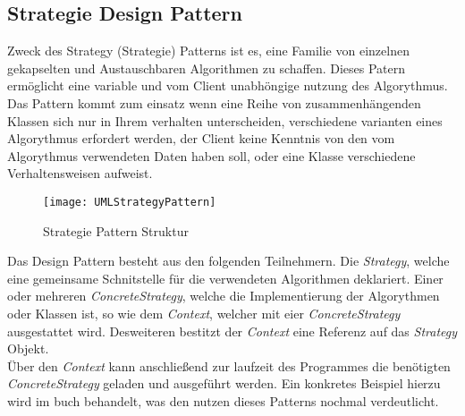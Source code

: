 \subsection{Strategie Design Pattern}
Zweck des Strategy (Strategie) Patterns ist es, eine Familie von einzelnen gekapselten und Austauschbaren Algorithmen zu schaffen. Dieses Patern ermöglicht eine variable und vom Client unabhöngige nutzung des Algorythmus.\\
Das Pattern kommt zum einsatz wenn eine Reihe von zusammenhängenden Klassen sich nur in Ihrem verhalten unterscheiden, verschiedene varianten eines Algorythmus erfordert werden, der Client keine Kenntnis von den vom Algorythmus verwendeten Daten haben soll, oder eine Klasse verschiedene Verhaltensweisen aufweist.\\
\begin{center}
    \begin{figure}[h]
     \centering
     \texttt{[image: UMLStrategyPattern]}
     \caption{Strategie Pattern Struktur \cite{DesignPatterns}}
    \label{fig:StrategyPattern}
    \end{figure}
\end{center}
\vspace{-2cm}
Das Design Pattern besteht aus den folgenden Teilnehmern. Die \textit{Strategy}, welche eine gemeinsame Schnitstelle für die verwendeten Algorithmen deklariert. Einer oder mehreren \textit{ConcreteStrategy}, welche die Implementierung der Algorythmen oder Klassen ist, so wie dem \textit{Context}, welcher mit eier \textit{ConcreteStrategy} ausgestattet wird. Desweiteren bestitzt der \textit{Context} eine Referenz auf das \textit{Strategy} Objekt.\cite[S.383 ff]{DesignPatterns}\\
Über den \textit{Context} kann anschließend zur laufzeit des Programmes die benötigten \textit{ConcreteStrategy} geladen und ausgeführt werden. 
Ein konkretes Beispiel hierzu wird im buch \cite[Head First Design Patterns]{HeadfirstDesignPatterns} behandelt, was den nutzen dieses Patterns nochmal verdeutlicht.